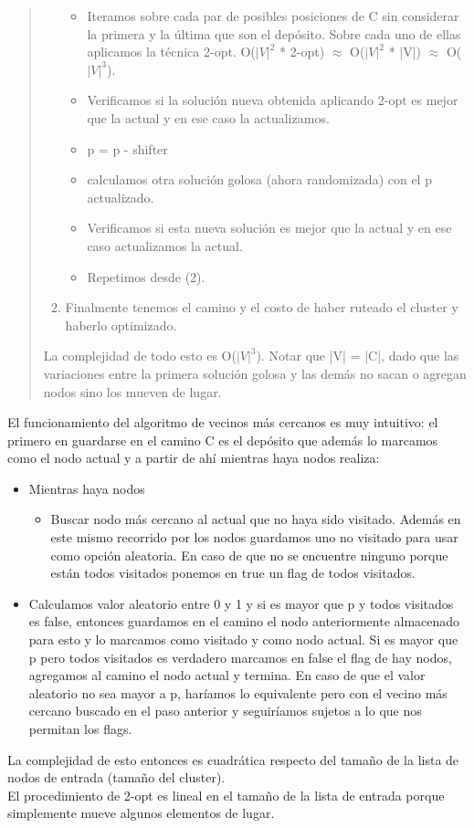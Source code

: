 \documentclass[11pt,a4paper]{article}
\begin{document}
\begin{verse}
\begin{enumerate}
\begin{itemize}
\item Iteramos sobre cada par de posibles posiciones de C sin considerar la primera y la última que son el depósito. Sobre cada uno de ellas aplicamos la técnica 2-opt. O($|V|^{2}$ * 2-opt) $\approx$ O($|V|^{2}$ * |V|) $\approx$ O($|V|^{3}$).
\item Verificamos si la solución nueva obtenida aplicando 2-opt es mejor que la actual y en ese caso la actualizamos.
\item p = p - shifter
\item calculamos otra solución golosa (ahora randomizada) con el p actualizado. 
\item Verificamos si esta nueva solución es mejor que la actual y en ese caso actualizamos la actual.
\item Repetimos desde (2).
\end{itemize}
\item Finalmente tenemos el camino y el costo de haber ruteado el cluster y haberlo optimizado.
\end{enumerate}
La complejidad de todo esto es O($|V|^{3}$). Notar que |V| = |C|, dado que las variaciones entre la primera solución golosa y las demás no sacan o agregan nodos sino los mueven de lugar.
\end{verse}

El funcionamiento del algoritmo de vecinos más cercanos es muy intuitivo: el primero en guardarse en el camino C es el depósito que además lo marcamos como el nodo actual y a partir de ahí mientras haya nodos realiza:
\begin{itemize}
\item Mientras haya nodos  
\begin{itemize}
\item Buscar nodo más cercano al actual que no haya sido visitado. Además en este mismo recorrido por los nodos guardamos uno no visitado para usar como opción aleatoria. En caso de que no se encuentre ninguno porque están todos visitados ponemos en true un flag de todos visitados.
\end{itemize}
\item Calculamos valor aleatorio entre 0 y 1 y si es mayor que p y todos visitados es false, entonces guardamos en el camino el nodo anteriormente almacenado para esto y lo marcamos como visitado y como nodo actual. Si es mayor que p pero todos visitados es verdadero marcamos en false el flag de hay nodos, agregamos al camino el nodo actual y termina. En caso de que el valor aleatorio no sea mayor a p, haríamos lo equivalente pero con el vecino más cercano buscado en el paso anterior y seguiríamos sujetos a lo que nos permitan los flags.
\end{itemize}
La complejidad de esto entonces es cuadrática respecto del tamaño de la lista de nodos de entrada (tamaño del cluster).
\\
El procedimiento de 2-opt es lineal en el tamaño de la lista de entrada porque simplemente mueve algunos elementos de lugar.\\
\end{document}
